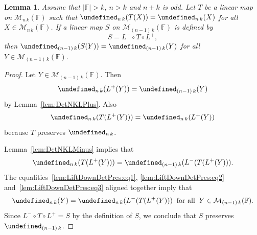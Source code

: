 \documentclass{elsarticle}
\def\F{{\mathbb F}}
\def\M{{\mathcal M}}
\let\det\undefined
\DeclareMathOperator{\det}{det}
\theoremstyle{plain}
\newtheorem{lemma}[theorem]{Lemma}
\theoremstyle{definition}
\numberwithin{equation}{section}
\begin{document}
\begin{lemma}\label{lem:LiftDownDetPres}Assume that  $|\F| > k$, $n > k$ and $n + k$ is odd. Let $T$ be a linear map on $\M_{n\, k} (\F)$ such that $\det_{n\, k} (T(X)) = \det_{n\,k}(X)$ for all $X \in \M_{n\,k}(\F)$. If a linear map $S$ on $\M_{(n-1)\,k}(\F)$ is defined by 
$$S = L^{-} \circ T \circ L^{+},$$
then $\det_{(n-1)\, k} (S(Y)) = \det_{(n-1)\,k}(Y)$ for all $Y \in \M_{(n-1)\,k}(\F)$.
\end{lemma}
\begin{proof}Let $Y \in \M_{(n-1)\,k}(\F)$. Then
\begin{equation}\label{lem:LiftDownDetPres:eq1}
\det_{n\,k}(L^{+}(Y)) = \det_{(n-1)\,k}(Y)
\end{equation}
 by Lemma~\ref{lem:DetNKLPlus}. Also %
\begin{equation}\label{lem:LiftDownDetPres:eq2}
\det_{n\,k}(T(L^{+}(Y))) = \det_{n\,k}(L^{+}(Y))
\end{equation}
because $T$ preserves $\det_{n\,k}$.

Lemma~\ref{lem:DetNKLMinus} implies that
\begin{equation}\label{lem:LiftDownDetPres:eq3}
\det_{n\,k}(T(L^{+}(Y))) = \det_{(n-1)\,k}(L^{-}(T(L^{+}(Y))).
\end{equation} The equalities~\eqref{lem:LiftDownDetPres:eq1}, \eqref{lem:LiftDownDetPres:eq2} and~\eqref{lem:LiftDownDetPres:eq3} aligned together imply that
\[
\det_{n\,k}(Y) = \det_{n\,k}(L^{-}(T(L^{+}(Y)))\;\;\mbox{for all}\;\; Y \in \M_{(n-1)\,k}(\F).
\]
Since $ L^{-} \circ T \circ L^{+} = S$ by the definition of $S$, we conclude that $S$ preserves $\det_{(n-1)\,k}$.
\end{proof}
\end{document}
